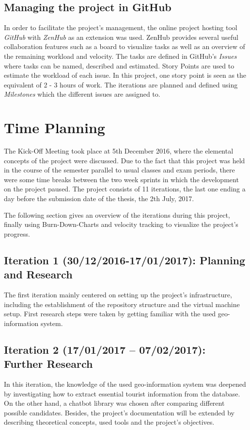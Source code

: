 \subsection{Managing the project in GitHub}
In order to facilitate the project’s management, the online project hosting tool \textit{GitHub} with \textit{ZenHub} as an extension was used. ZenHub provides several useful collaboration features such as a board to visualize tasks as well as an overview of the remaining workload and velocity. The tasks are defined in GitHub’s \textit{Issues} where tasks can be named, described and estimated. Story Points are used to estimate the workload of each issue. In this project, one story point is seen as the equivalent of 2 - 3 hours of work. The iterations are planned and defined using \textit{Milestones} which the different issues are assigned to.
	

\section{Time Planning}
The Kick-Off Meeting took place at 5th December 2016, where the elemental concepts of the project were discussed. Due to the fact that this project was held in the course of the semester parallel to usual classes and exam periods, there were some time breaks between the two week sprints in which the development on the project paused. The project consists of 11 iterations, the last one ending a day before the submission date of the thesis, the 2th July, 2017.

The following section gives an overview of the iterations during this project, finally using Burn-Down-Charts and velocity tracking to visualize the project’s progress.

\subsection{Iteration 1 (30/12/2016-17/01/2017): Planning and Research}
The first iteration mainly centered on setting up the project's infrastructure, including the establishment of the repository structure and the virtual machine setup. First research steps were taken by getting familiar with the used geo-information system. 

\subsection{Iteration 2 (17/01/2017 – 07/02/2017): Further Research}
In this iteration, the knowledge of the used geo-information system was deepened by investigating how to extract essential tourist information from the database. On the other hand, a chatbot library was chosen after comparing different possible candidates. Besides, the project's documentation will be extended by describing theoretical concepts, used tools and the project's objectives.

